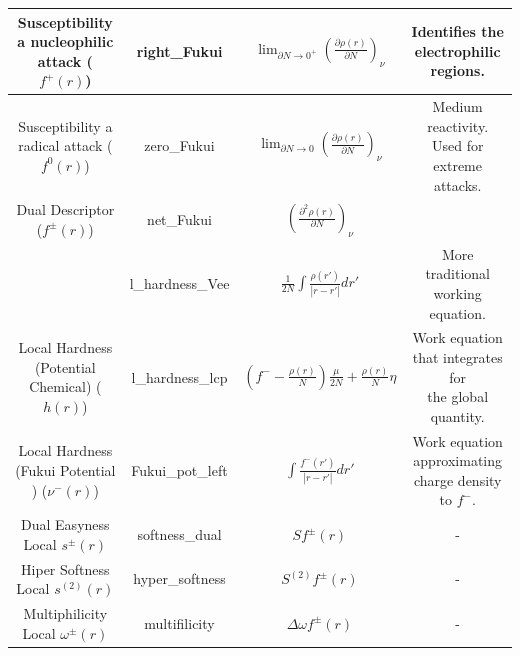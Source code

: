 \documentclass[a4paper,11pt]{refart}
\begin{document}
\begin{minipage}{\fullwidth}
\begin{table}[H]
\begin{tabular}{c|c|c|c}
			\makecell{Susceptibility \\a nucleophilic attack\\ ($f^+(r)$)}&right\_Fukui&$\lim_{\partial N \to 0^+}\left(\frac{\partial \rho(r )}{\partial N} \right)_\nu$ & \makecell{Identifies the\\ electrophilic regions.} \\ \hline
			\makecell{Susceptibility \\a radical attack \\($f^0(r)$)}&zero\_Fukui&$\lim_{\partial N \to 0}\left(\frac{\partial \rho(r)} {\partial N} \right)_\nu$ & \makecell{Medium reactivity.\\ Used for extreme attacks.} \\ \hline
			\makecell{Dual Descriptor \\($f^{\pm}(r)$)}&net\_Fukui &$\left(\frac{\partial ^2 \rho(r)}{\partial N} \right) _\nu$ & \makecell{Identifies the net trend.} \\ \hline
			\makecell{Local Hardness ($h(r)$)} &l\_hardness\_Vee &$\frac{1}{2N} \int \frac{\rho(r')}{|r-r'|} dr '$ & \makecell{More traditional\\working equation.} \\ \hline
			\makecell{Local Hardness \\(Potential\\ Chemical) ($h(r)$)} & l\_hardness\_lcp & $ \left (f^- - \frac{\rho(r)}{N} \right) \frac{\mu}{2N} + \frac{\rho(r)}{N}\eta$ & \makecell{Work equation\\ that integrates for\\the global quantity.} \\ \hline
			\makecell{Local Hardness \\(Fukui Potential\\) ($\nu^{-}(r)$)} & Fukui\_pot\_left & $\int \frac{f^{-}(r') }{|r - r'|}dr'$ & \makecell{Work equation\\ approximating charge \\density to $f^{-}$.} \\ \hline
			\makecell{Dual Easyness\\ Local $s^{\pm}(r)$} & softness\_dual & $Sf^{\pm}(r)$ & - \\ \hline
			\makecell{Hiper Softness\\Local $s^{(2)}(r)$ } & hyper\_softness & $S^{(2)}f^{\pm}(r)$ & - \\ \hline
			\makecell{Multiphilicity\\Local $ \omega^{\pm}(r)$} & multifilicity & $\Delta\omega f^{\pm}(r)$ & - \\
			\bottomrule
		\end{tabular}
		\label{tab_local1}
	\end{table}
\end{minipage}
\end{document}
